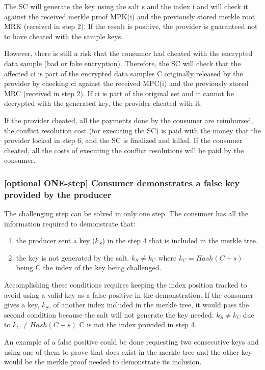 \documentclass[]{article}
\begin{document}
	The SC will generate the key using the salt s and the index i and will check it against the received merkle proof MPK(i) and the previously stored merkle root MRK (received in step 2). If the result is positive, the provider is guaranteed not to have cheated with the sample keys.

	However, there is still a risk that the consumer had cheated with the encrypted data sample (bad or fake encryption). Therefore, the SC will check that the affected ci is part of the encrypted data samples C originally released by the provider by checking ci against the received MPC(i) and the previously stored MRC (received in step 2). If ci is part of the original set and it cannot be decrypted with the generated key, the provider cheated with it.

	If the provider cheated, all the payments done by the consumer are reimbursed, the conflict resolution cost (for executing the SC) is paid with the money that the provider locked in step 6, and the SC is finalized and killed. If the consumer cheated, all the costs of executing the conflict resolutions will be paid by the consumer.
	
	\subsubsection{[optional ONE-step] Consumer demonstrates a false key provided by the producer}
	The challenging step can be solved in only one step. The consumer has all the information required to demonstrate that:
	\begin{enumerate}
		\item the producer sent a key ($k_S$) in the step 4 that is included in the merkle tree.
		\item the key is not generated by the salt.  $k_S \neq k_C$ where $k_C = Hash(C + s)$ being C the index of the key being challenged.
	\end{enumerate}
	
	Accomplishing these conditions requires keeping the index position tracked to avoid using a valid key as a false positive in the demonstration. If the consumer gives a key, $k_S$, of another index included in the merkle tree, it would pass the second condition because the salt will not generate the key needed. $k_S \neq k_C$ due to $k_C \neq Hash(C + s)$ C is not the index provided in step 4. 
	
	An example of a false positive could be done requesting two consecutive keys and using one of them to prove that does exist in the merkle tree and the other key would be the merkle proof needed to demonstrate its inclusion.
	
\end{document}
